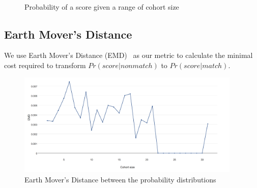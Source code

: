 \begin{figure}[ht]
  \centering
  \label{fig:otago_pscohort}\\ %
  \caption{Probability of a score given a range of cohort size}
  \label{fig:otago_psnoncohort} %
\end{figure}

\subsection{Earth Mover's Distance}

We use Earth Mover's Distance (EMD)~\cite{emd00} as our metric to calculate the
minimal cost required to transform $Pr(score|nonmatch)$ to $Pr(score|match)$.

\begin{figure}[ht]
  \centering
  \includegraphics[width=0.95\textwidth]{dataset/grand/emd}
  \caption{Earth Mover's Distance between the probability distributions}
  \label{fig:grand_emd} %
\end{figure}

